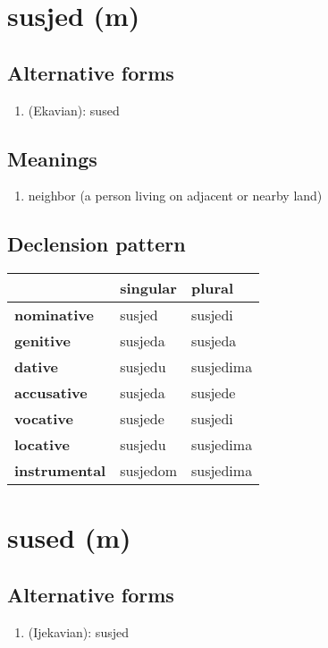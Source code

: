 \filbreak
\section{susjed (m)}
\subsection*{Alternative forms}
\begin{enumerate}
\item (Ekavian): sused
\end{enumerate}
\subsection*{Meanings}
\begin{enumerate}
\item neighbor (a person living on adjacent or nearby land)
\end{enumerate}
\subsection*{Declension pattern}
\begin{tabularx}{\linewidth}{Xll}
\toprule
{} &  singular &     plural \\
\midrule
\textbf{nominative  } &    susjed &    susjedi \\
\textbf{genitive    } &   susjeda &    susjeda \\
\textbf{dative      } &   susjedu &  susjedima \\
\textbf{accusative  } &   susjeda &    susjede \\
\textbf{vocative    } &   susjede &    susjedi \\
\textbf{locative    } &   susjedu &  susjedima \\
\textbf{instrumental} &  susjedom &  susjedima \\
\bottomrule
\end{tabularx}

\filbreak
\section{sused (m)}
\subsection*{Alternative forms}
\begin{enumerate}
\item (Ijekavian): susjed
\end{enumerate}
